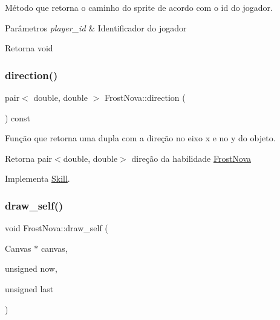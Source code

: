 Método que retorna o caminho do sprite de acordo com o id do jogador. 


\begin{DoxyParams}{Parâmetros}
{\em player\+\_\+id} & Identificador do jogador \\
\hline
\end{DoxyParams}
\begin{DoxyReturn}{Retorna}
void 
\end{DoxyReturn}
\mbox{\label{classFrostNova_a9ec9aeb096b42670bf640ea47f27fd84}} 
\subsubsection{\texorpdfstring{direction()}{direction()}}
{\footnotesize\ttfamily pair$<$ double, double $>$ Frost\+Nova\+::direction (\begin{DoxyParamCaption}{ }\end{DoxyParamCaption}) const\hspace{0.3cm}{\ttfamily [virtual]}}



Função que retorna uma dupla com a direção no eixo x e no y do objeto. 

\begin{DoxyReturn}{Retorna}
pair$<$double, double$>$ direção da habilidade \mbox{\hyperlink{classFrostNova}{Frost\+Nova}} 
\end{DoxyReturn}


Implementa \mbox{\hyperlink{classSkill}{Skill}}.

\mbox{\label{classFrostNova_a0300555461a04885ec1596d60a5a82b7}} 
\subsubsection{\texorpdfstring{draw\+\_\+self()}{draw\_self()}}
{\footnotesize\ttfamily void Frost\+Nova\+::draw\+\_\+self (\begin{DoxyParamCaption}\item[{Canvas $\ast$}]{canvas,  }\item[{unsigned}]{now,  }\item[{unsigned}]{last }\end{DoxyParamCaption})\hspace{0.3cm}{\ttfamily [protected]}}



